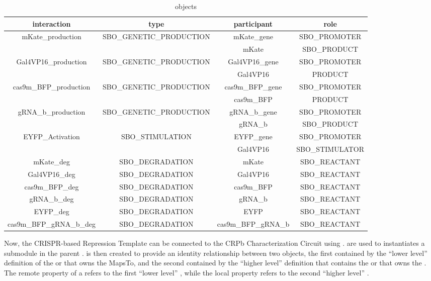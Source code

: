 \begin{table}[tb]
\caption{ objects}
\label{tbl:tbl-Interaction}
\centering
{\small
\begin{tabular}{c@{\hspace{1.5em}}c@{\hspace{1.5em}}c@{\hspace{1.5em}}c@{\hspace{1.5em}}}
\hline
interaction&
type&
participant&
role\\
\hline
\multirow{2}{*}{mKate\_production}&\multirow{2}{*}{SBO\_GENETIC\_PRODUCTION}&mKate\_gene&SBO\_PROMOTER\\
  &&mKate&SBO\_PRODUCT\\ \hline %
\multirow{2}{*}{Gal4VP16\_production}&\multirow{2}{*}{SBO\_GENETIC\_PRODUCTION}&Gal4VP16\_gene&SBO\_PROMOTER\\
  &&Gal4VP16&PRODUCT\\ \hline %
\multirow{2}{*}{cas9m\_BFP\_production}&\multirow{2}{*}{SBO\_GENETIC\_PRODUCTION}&cas9m\_BFP\_gene&SBO\_PROMOTER\\
  &&cas9m\_BFP&PRODUCT\\ \hline %
\multirow{2}{*}{gRNA\_b\_production}&\multirow{2}{*}{SBO\_GENETIC\_PRODUCTION}&gRNA\_b\_gene&SBO\_PROMOTER\\
  &&gRNA\_b&SBO\_PRODUCT\\ \hline %
\multirow{2}{*}{EYFP\_Activation}&\multirow{2}{*}{SBO\_STIMULATION}&EYFP\_gene&SBO\_PROMOTER\\
  &&Gal4VP16&SBO\_STIMULATOR\\ \hline %
mKate\_deg&SBO\_DEGRADATION&mKate&SBO\_REACTANT\\ \hline%
Gal4VP16\_deg&SBO\_DEGRADATION&Gal4VP16&SBO\_REACTANT\\ \hline%
cas9m\_BFP\_deg&SBO\_DEGRADATION&cas9m\_BFP&SBO\_REACTANT\\ \hline%
gRNA\_b\_deg&SBO\_DEGRADATION&gRNA\_b&SBO\_REACTANT\\ \hline%
EYFP\_deg&SBO\_DEGRADATION&EYFP&SBO\_REACTANT\\ \hline%
cas9m\_BFP\_gRNA\_b\_deg&SBO\_DEGRADATION&cas9m\_BFP\_gRNA\_b&SBO\_REACTANT\\ \hline%
\end{tabular}
}
\end{table}

Now, the CRISPR-based Repression Template can be connected to the CRPb Characterization Circuit using .  are used to instantiates a submodule in the parent .  is then created to provide an identity relationship between two  objects, the first contained by the “lower level” definition of the  or  that owns the MapsTo, and the second contained by the
“higher level” definition that contains the  or  that owns the . The remote property of a  refers to the first “lower level” , while the local property refers to the second “higher level” . 



